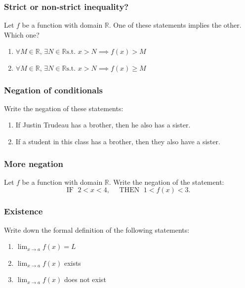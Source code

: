 \documentclass[14pt]{beamer}
\begin{document}
\begin{frame}
	\frametitle{Strict or non-strict inequality?}

	Let $f$ be a function with domain $\mathbb{R}$. One of these statements implies
	the other. Which one?

	\begin{enumerate}
		\item $\displaystyle \forall M \in \mathbb{R}, \, \exists N \in \mathbb{R}\text{
			s.t. }x>N \implies f(x) > M$

		\item $\displaystyle \forall M \in \mathbb{R}, \, \exists N \in \mathbb{R}\text{
			s.t. }x>N \implies f(x) \geq M$
	\end{enumerate}
\end{frame}

\begin{frame}
	\frametitle{Negation of conditionals}

	Write the negation of these statements:
	\begin{enumerate}
		\item If Justin Trudeau has a brother, then he also has a sister.

		\item If a student in this class has a brother, then they also have a sister.
	\end{enumerate}
\end{frame}

\begin{frame}
	\frametitle{More negation}

	Let $f$ be a function with domain $\mathbb{R}$. Write the negation of the statement:
	\begin{equation*}
		\text{IF }\; 2<x<4, \quad \text{ THEN }\; 1<f(x)<3.
	\end{equation*}
\end{frame}

\begin{frame}
	\frametitle{Existence}

	Write down the formal definition of the following statements:

	\vfill
	\begin{enumerate}
		\item $\displaystyle \lim_{x \to a}f(x) = L$
			\vfill

		\item $\displaystyle \lim_{x \to a}f(x)$ exists

			\vfill

		\item $\displaystyle \lim_{x \to a}f(x)$ does not exist
	\end{enumerate}

	\vfill
\end{frame}
\end{document}
